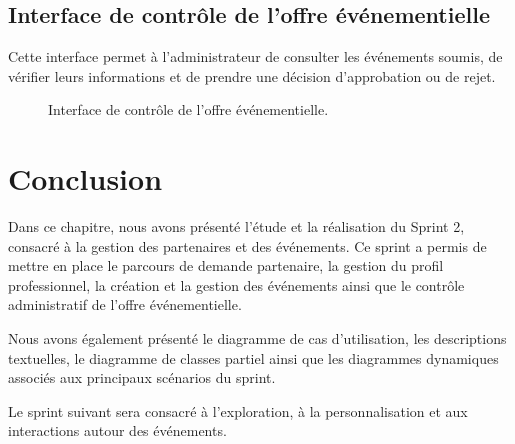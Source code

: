 \subsection{Interface de contrôle de l’offre événementielle}


Cette interface permet à l’administrateur de consulter les événements soumis, de vérifier leurs informations et de prendre une décision d’approbation ou de rejet.


\begin{figure}[H]
\centering
{}
\caption{Interface de contrôle de l’offre événementielle.}
\label{figure:4-11}
\end{figure}


\section{Conclusion}


Dans ce chapitre, nous avons présenté l’étude et la réalisation du Sprint 2, consacré à la gestion des partenaires et des événements. Ce sprint a permis de mettre en place le parcours de demande partenaire, la gestion du profil professionnel, la création et la gestion des événements ainsi que le contrôle administratif de l’offre événementielle.


Nous avons également présenté le diagramme de cas d’utilisation, les descriptions textuelles, le diagramme de classes partiel ainsi que les diagrammes dynamiques associés aux principaux scénarios du sprint.


Le sprint suivant sera consacré à l’exploration, à la personnalisation et aux interactions autour des événements.


